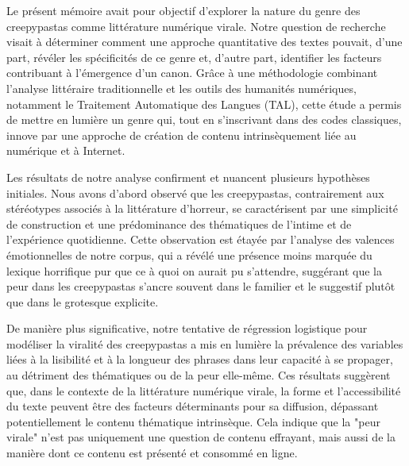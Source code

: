 \documentclass[12pt,a4paper,oneside,titlepage]{book} %
\begin{document}

Le présent mémoire avait pour objectif d'explorer la nature du genre des creepypastas comme littérature numérique virale. Notre question de recherche visait à déterminer comment une approche quantitative des textes pouvait, d'une part, révéler les spécificités de ce genre et, d'autre part, identifier les facteurs contribuant à l'émergence d'un canon. Grâce à une méthodologie combinant l'analyse littéraire traditionnelle et les outils des humanités numériques, notamment le Traitement Automatique des Langues (TAL), cette étude a permis de mettre en lumière un genre qui, tout en s'inscrivant dans des codes classiques, innove par une approche de création de contenu intrinsèquement liée au numérique et à Internet.

Les résultats de notre analyse confirment et nuancent plusieurs hypothèses initiales. Nous avons d'abord observé que les creepypastas, contrairement aux stéréotypes associés à la littérature d'horreur, se caractérisent par une simplicité de construction et une prédominance des thématiques de l'intime et de l'expérience quotidienne. Cette observation est étayée par l'analyse des valences émotionnelles de notre corpus, qui a révélé une présence moins marquée du lexique horrifique pur que ce à quoi on aurait pu s'attendre, suggérant que la peur dans les creepypastas s'ancre souvent dans le familier et le suggestif plutôt que dans le grotesque explicite.

De manière plus significative, notre tentative de régression logistique pour modéliser la viralité des creepypastas a mis en lumière la prévalence des variables liées à la lisibilité et à la longueur des phrases dans leur capacité à se propager, au détriment des thématiques ou de la peur elle-même. Ces résultats suggèrent que, dans le contexte de la littérature numérique virale, la forme et l'accessibilité du texte peuvent être des facteurs déterminants pour sa diffusion, dépassant potentiellement le contenu thématique intrinsèque. Cela indique que la "peur virale" n'est pas uniquement une question de contenu effrayant, mais aussi de la manière dont ce contenu est présenté et consommé en ligne.
\end{document}
